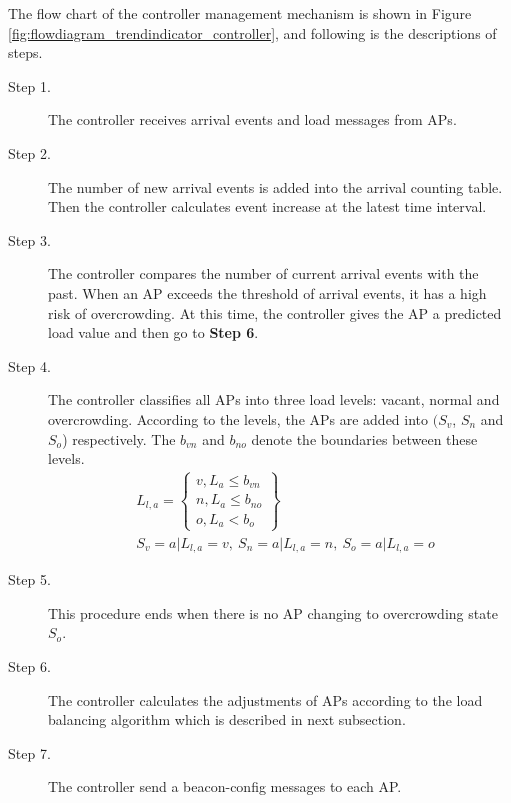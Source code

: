 The flow chart of the controller management mechanism is shown in Figure \ref{fig:flowdiagram_trendindicator_controller}, and following is the descriptions of steps.

\begin{description}
  \item [Step 1.] The controller receives arrival events and load messages from APs.
  \item [Step 2.] The number of new arrival events is added into the arrival counting table. Then the controller calculates event increase at the latest time interval.
  \item [Step 3.] The controller compares the number of current arrival events with the past. When an AP exceeds the threshold of arrival events, it has a high risk of overcrowding. At this time, the controller gives the AP a predicted load value and then go to \textbf{Step 6}.
  \item [Step 4.] The controller classifies all APs into three load levels: vacant, normal and overcrowding. According to the levels, the APs are added into $({S_v}$, ${S_n}$ and ${S_o}$) respectively. The $b_{vn}$ and $b_{no}$ denote the boundaries between these levels.
      \begin{align}
        &L_{l,a}=\left\{\begin{array}{lll}
            v, L_a \leq b_{vn} \\ n, L_a \leq b_{no} \\ o, L_a < b_o
            \end{array} \right\} \\
            \nonumber
        &S_v={a|L_{l,a}=v},\ 
        S_n={a|L_{l,a}=n},\ 
        S_o={a|L_{l,a}=o}
      \end{align}
  \item [Step 5.] This procedure ends when there is no AP changing to overcrowding state $S_o$.
  \item [Step 6.] The controller calculates the adjustments of APs according to the load balancing algorithm which is described in next subsection.
  \item [Step 7.] The controller send a beacon-config messages to each AP.
\end{description}

